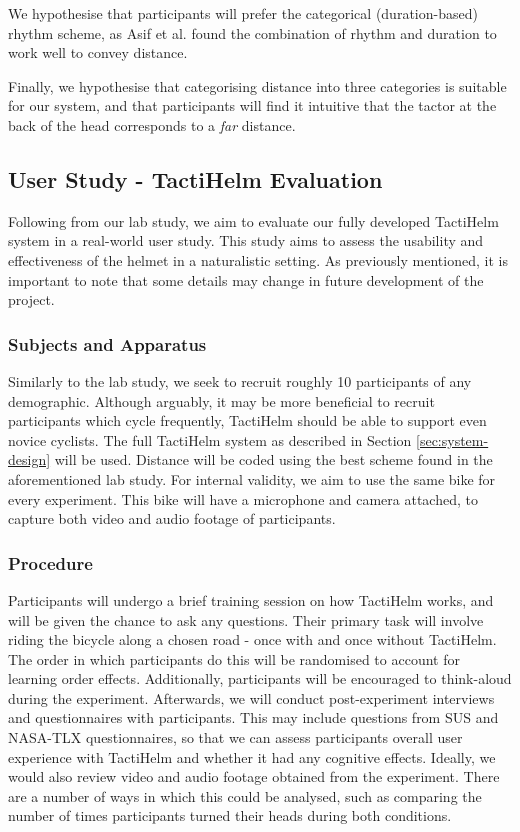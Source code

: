 \documentclass{interim}
\begin{document}
We hypothesise that participants will prefer the categorical (duration-based) rhythm scheme, as Asif et al. \cite{10.1145/1868914.1868923} found the combination of rhythm and duration to work well to convey distance.

Finally, we hypothesise that categorising distance into three categories is suitable for our system, and that participants will find it intuitive that the tactor at the back of the head corresponds to a \textit{far} distance.




\subsection{User Study - TactiHelm Evaluation}\label{sec:user-study}
Following from our lab study, we aim to evaluate our fully developed TactiHelm system in a real-world user study. This study aims to assess the usability and effectiveness of the helmet in a naturalistic setting. As previously mentioned, it is important to note that some details may change in future development of the project.

\subsubsection{Subjects and Apparatus}
Similarly to the lab study, we seek to recruit roughly 10 participants of any demographic. Although arguably, it may be more beneficial to recruit participants which cycle frequently, TactiHelm should be able to support even novice cyclists. The full TactiHelm system as described in Section \ref{sec:system-design} will be used. Distance will be coded using the best scheme found in the aforementioned lab study. For internal validity, we aim to use the same bike for every experiment. This bike will have a microphone and camera attached, to capture both video and audio footage of participants.

\subsubsection{Procedure}
Participants will undergo a brief training session on how TactiHelm works, and will be given the chance to ask any questions. Their primary task will involve riding the bicycle along a chosen road - once with and once without TactiHelm. The order in which participants do this will be randomised to account for learning order effects. Additionally, participants will be encouraged to think-aloud during the experiment. Afterwards, we will conduct post-experiment interviews and questionnaires with participants. This may include questions from SUS and NASA-TLX questionnaires, so that we can assess participants overall user experience with TactiHelm and whether it had any cognitive effects. Ideally, we would also review video and audio footage obtained from the experiment. There are a number of ways in which this could be analysed, such as comparing the number of times participants turned their heads during both conditions.
\end{document}

